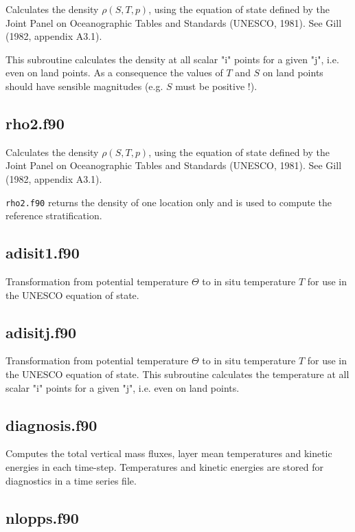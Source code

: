 Calculates the density $\rho(S,T,p)$, using the equation of state
defined by the Joint Panel on Oceanographic Tables and Standards (UNESCO,
1981). See Gill (1982, appendix A3.1).

This subroutine calculates the density
at all scalar "i" points for a given "j", i.e. even on land points.
 As a consequence the values of $T$ and $S$ on land points should have sensible
magnitudes (e.g. $S$ must be positive !).

\subsection{rho2.f90}

Calculates the density $\rho(S,T,p)$, using the equation of state
defined by the Joint Panel on Oceanographic Tables and Standards (UNESCO,
1981). See Gill (1982, appendix A3.1).

{\tt rho2.f90} returns the density of one location only and is used to compute
the reference stratification.


\subsection{adisit1.f90}

Transformation from potential temperature $\Theta$ to in situ temperature
$T$ for use in the UNESCO equation of state.

\subsection{adisitj.f90}

Transformation from potential temperature $\Theta$ to in situ temperature
$T$ for use in the UNESCO equation of state.
This subroutine calculates the temperature
at all scalar "i" points for a given "j", i.e. even on land points.

\subsection{diagnosis.f90}


Computes the total vertical mass fluxes, layer mean temperatures
and kinetic energies in each time-step. Temperatures and kinetic energies are
stored  for diagnostics in a time series file.

\subsection{nlopps.f90}

